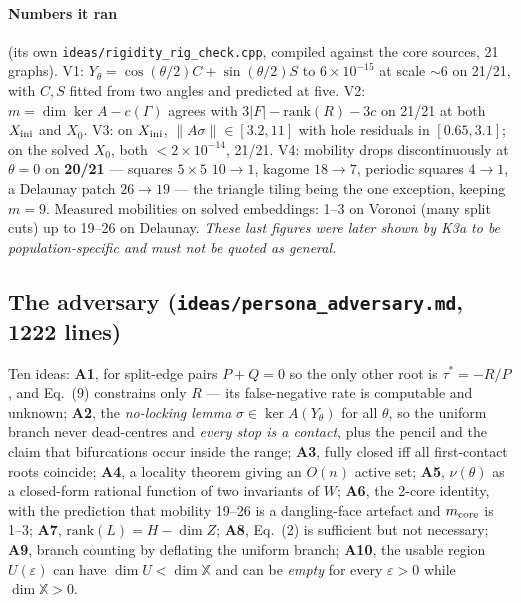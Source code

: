 \documentclass[10pt,a4paper]{article}
\newcommand{\fn}[1]{\nolinkurl{#1}}
\begin{document}
\paragraph{Numbers it ran} (its own \fn{ideas/rigidity_rig_check.cpp}, compiled against the core
sources, 21 graphs). V1: $Y_\theta = \cos(\theta/2)C+\sin(\theta/2)S$ to
$6\times10^{-15}$ at scale $\sim6$ on 21/21, with $C,S$ fitted from two angles and predicted at
five. V2: $m = \dim\ker A - c(\Gamma)$ agrees with $3|F| - \mathrm{rank}(R) - 3c$ on 21/21 at
both $X_{\rm ini}$ and $X_0$. V3: on $X_{\rm ini}$, $\|A\sigma\| \in [3.2, 11]$ with hole
residuals in $[0.65, 3.1]$; on the solved $X_0$, both $< 2\times10^{-14}$, 21/21. V4: mobility
drops discontinuously at $\theta=0$ on \textbf{20/21} --- squares $5\times5$ $10\to1$, kagome
$18\to7$, periodic squares $4\to1$, a Delaunay patch $26\to19$ --- the triangle tiling being the
one exception, keeping $m=9$. Measured mobilities on solved embeddings: 1--3 on Voronoi (many
split cuts) up to 19--26 on Delaunay. \emph{These last figures were later shown by K3a to be
population-specific and must not be quoted as general.}

\subsection{The adversary (\texttt{ideas/persona\_adversary.md}, 1222 lines)}

Ten ideas: \textbf{A1}, for split-edge pairs $P+Q=0$ so the only other root is $\tau^*=-R/P$,
and Eq.~(9) constrains only $R$ --- its false-negative rate is computable and unknown;
\textbf{A2}, the \emph{no-locking lemma} $\sigma\in\ker A(Y_\theta)$ for all $\theta$, so the
uniform branch never dead-centres and \emph{every stop is a contact}, plus the pencil and the
claim that bifurcations occur inside the range; \textbf{A3}, fully closed iff all first-contact
roots coincide; \textbf{A4}, a locality theorem giving an $O(n)$ active set; \textbf{A5},
$\nu(\theta)$ as a closed-form rational function of two invariants of $W$; \textbf{A6}, the
2-core identity, with the prediction that mobility 19--26 is a dangling-face artefact and
$m_{\rm core}$ is 1--3; \textbf{A7}, $\mathrm{rank}(L) = H - \dim Z$; \textbf{A8}, Eq.~(2) is
sufficient but not necessary; \textbf{A9}, branch counting by deflating the uniform branch;
\textbf{A10}, the usable region $U(\varepsilon)$ can have $\dim U < \dim\mathbb X$ and can be
\emph{empty} for every $\varepsilon>0$ while $\dim\mathbb X > 0$.
\end{document}
